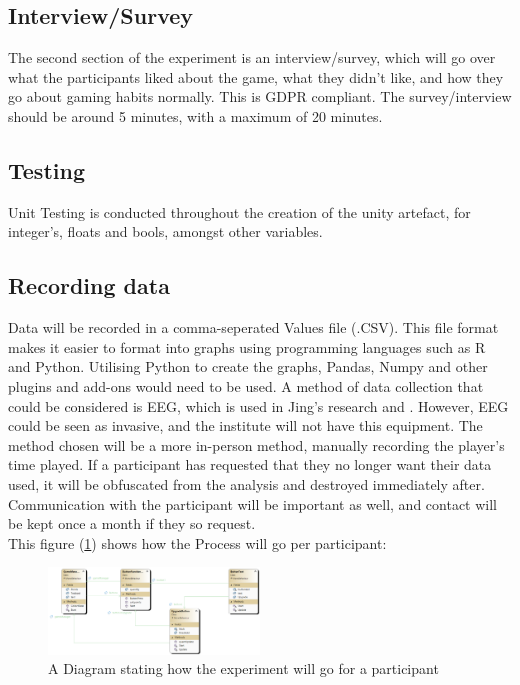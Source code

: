 \documentclass[conference]{IEEEtran}
\begin{document}
\subsection{Interview/Survey}
The second section of the experiment is an interview/survey, which will go over what the participants liked about the game, what they didn't like, and how they go about gaming habits normally. This is GDPR compliant. The survey/interview should be around 5 minutes, with a maximum of 20 minutes.

\subsection{Testing}
Unit Testing is conducted throughout the creation of the unity artefact, for integer's, floats and bools, amongst other variables.

\subsection{Recording data}
Data will be recorded in a comma-seperated Values file (.CSV). This file format makes it easier to format into graphs using programming languages such as R and Python. Utilising Python to create the graphs, Pandas, Numpy and other plugins and add-ons would need to be used. A method of data collection that could be considered is EEG, which is used in Jing's research \cite{Jing2024} and \cite{Ruqeyya2022}. However, EEG could be seen as invasive, and the institute will not have this equipment. The method chosen will be a more in-person method, manually recording the player's time played. If a participant has requested that they no longer want their data used, it will be obfuscated from the analysis and destroyed immediately after. Communication with the participant will be important as well, and contact will be kept once a month if they so request.\\

This figure (\ref{tab:figure2}) shows how the Process will go per participant:

\begin{figure}[H]
\includegraphics[width = 0.5\textwidth]{UMLProcess}
\caption{A Diagram stating how the experiment will go for a participant}
\label{tab:figure2}
\end{figure}
\end{document}
